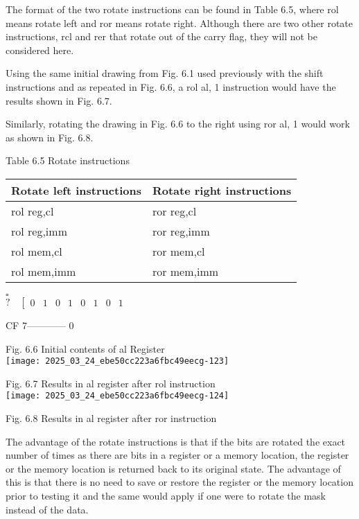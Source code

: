 \documentclass[10pt]{article}
\begin{document}
The format of the two rotate instructions can be found in Table 6.5, where rol means rotate left and ror means rotate right. Although there are two other rotate instructions, rcl and rer that rotate out of the carry flag, they will not be considered here.

Using the same initial drawing from Fig. 6.1 used previously with the shift instructions and as repeated in Fig. 6.6, a rol al, 1 instruction would have the results shown in Fig. 6.7.

Similarly, rotating the drawing in Fig. 6.6 to the right using ror al, 1 would work as shown in Fig. 6.8.

Table 6.5 Rotate instructions

\begin{center}
\begin{tabular}{|ll|}
\hline
Rotate left instructions & Rotate right instructions \\
\hline
rol reg,cl & ror reg,cl \\
rol reg,imm & ror reg,imm \\
rol mem,cl & ror mem,cl \\
rol mem,imm & ror mem,imm \\
\hline
\end{tabular}
\end{center}

$\square$\\
$? \quad\left[\begin{array}{llllllll}0 & 1 & 0 & 1 & 0 & 1 & 0 & 1\end{array}\right.$

CF 7------------ 0

Fig. 6.6 Initial contents of al Register\\
\texttt{[image: 2025\_03\_24\_ebe50cc223a6fbc49eecg-123]}

Fig. 6.7 Results in al register after rol instruction\\
\texttt{[image: 2025\_03\_24\_ebe50cc223a6fbc49eecg-124]}

Fig. 6.8 Results in al register after ror instruction

The advantage of the rotate instructions is that if the bits are rotated the exact number of times as there are bits in a register or a memory location, the register or the memory location is returned back to its original state. The advantage of this is that there is no need to save or restore the register or the memory location prior to testing it and the same would apply if one were to rotate the mask instead of the data.
\end{document}
